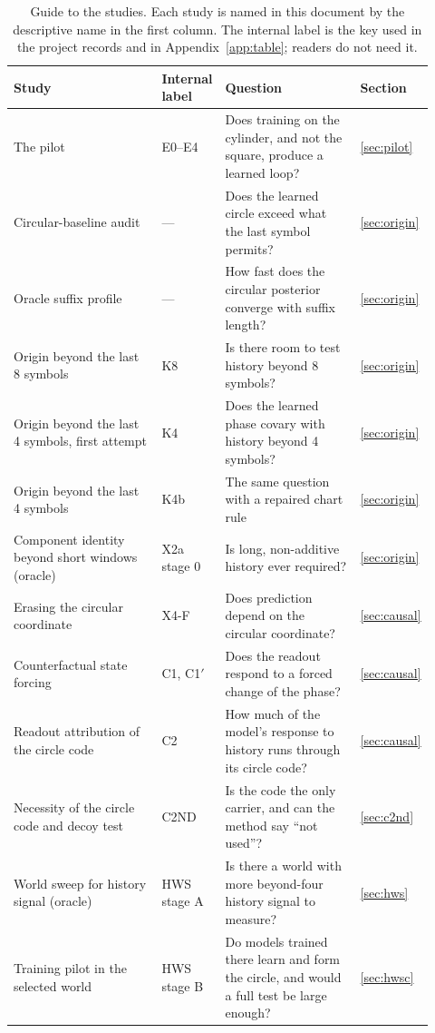\documentclass[11pt,a4paper]{article}
\DeclareRobustCommand{\_}{\ifmmode\origunderscore\else\textunderscore\allowbreak\fi}
\begin{document}
\begin{table}[p]\centering\footnotesize
\caption{Guide to the studies. Each study is named in this document by the descriptive name in
the first column. The internal label is the key used in the project records and in
Appendix~\ref{app:table}; readers do not need it.}\label{tab:key}
\begin{tabular}{@{}L{0.36\linewidth}L{0.15\linewidth}L{0.33\linewidth}L{0.08\linewidth}@{}}
\toprule
Study & Internal label & Question & Section\\
\midrule
The pilot & E0--E4 & Does training on the cylinder, and not the square, produce a learned loop? & \ref{sec:pilot}\\
Circular-baseline audit & --- & Does the learned circle exceed what the last symbol permits? & \ref{sec:origin}\\
Oracle suffix profile & --- & How fast does the circular posterior converge with suffix length? & \ref{sec:origin}\\
Origin beyond the last 8 symbols & K8 & Is there room to test history beyond 8 symbols? & \ref{sec:origin}\\
Origin beyond the last 4 symbols, first attempt & K4 & Does the learned phase covary with history beyond 4 symbols? & \ref{sec:origin}\\
Origin beyond the last 4 symbols & K4b & The same question with a repaired chart rule & \ref{sec:origin}\\
Component identity beyond short windows (oracle) & X2a stage 0 & Is long, non-additive history ever required? & \ref{sec:origin}\\
Erasing the circular coordinate & X4-F & Does prediction depend on the circular coordinate? & \ref{sec:causal}\\
Counterfactual state forcing & C1, C1$'$ & Does the readout respond to a forced change of the phase? & \ref{sec:causal}\\
Readout attribution of the circle code & C2 & How much of the model's response to history runs through its circle code? & \ref{sec:causal}\\
Necessity of the circle code and decoy test & C2ND & Is the code the only carrier, and can the method say ``not used''? & \ref{sec:c2nd}\\
World sweep for history signal (oracle) & HWS stage A & Is there a world with more beyond-four history signal to measure? & \ref{sec:hws}\\
Training pilot in the selected world & HWS stage B & Do models trained there learn and form the circle, and would a full test be large enough? & \ref{sec:hwsc}\\

\end{tabular}
\end{table}
\end{document}
